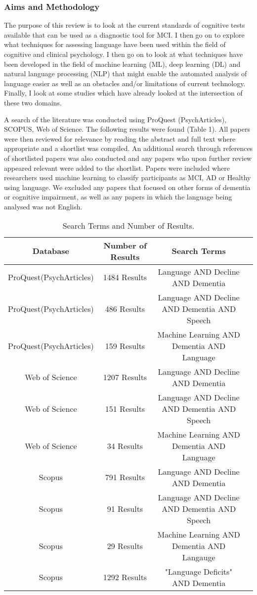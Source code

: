 \documentclass[12pt, twoside, a4paper]{article}
\begin{document}
\subsubsection{Aims and Methodology}
\par
The purpose of this review is to look at the current standards of cognitive tests available that can be used as a diagnostic tool for MCI. I then go on to explore what techniques for assessing language have been used within the field of cognitive and clinical psychology. I then go on to look at what techniques have been developed in the field of machine learning (ML), deep learning (DL) and natural language processing (NLP) that might enable the automated analysis of language easier as well as an obstacles and/or limitations of current technology. Finally, I look at some studies which have already looked at the intersection of these two domains. \newline
\par
A search of the literature was conducted using ProQuest (PsychArticles), SCOPUS, Web of Science. The following results were found (Table 1). All papers were then reviewed for relevance by reading the abstract and full text where appropriate and a shortlist was compiled. An additional search through references of shortlisted papers was also conducted and any papers who upon further review appeared relevant were added to the shortlist. Papers were included where researchers used machine learning to classify participants as MCI, AD or Healthy using language. We excluded any papers that focused on other forms of dementia or cognitive impairment, as well as any papers in which the language being analysed was not English. 
\begin{table}
	\begin{tabular}{ | c | c | c | p{1cm} |}
		\hline
		Database & Number of Results & Search Terms  \\ \hline
		ProQuest(PsychArticles) & 1484 Results & Language AND Decline AND Dementia \\ \hline
		ProQuest(PsychArticles) & 486 Results  & Language AND Decline AND Dementia AND Speech \\ \hline
		ProQuest(PsychArticles) & 159 Results & Machine Learning AND Dementia AND Language \\ \hline
		Web of Science & 1207 Results  & Language AND Decline AND Dementia   \\ \hline
		Web of Science & 151 Results  & Language AND Decline AND Dementia AND Speech  \\ \hline
		Web of Science & 34 Results & Machine Learning AND Dementia AND Language \\ \hline
		Scopus & 791 Results & Language AND Decline AND Dementia  \\ \hline
		Scopus & 91 Results & Language AND Decline AND Dementia AND Speech   \\ \hline
		Scopus & 29 Results & Machine Learning AND Dementia AND Langauge \\ \hline
		Scopus & 1292 Results & "Language Deficits" AND Dementia \\ \hline
	\end{tabular}
	\caption{\label{tab:table-name}Search Terms and Number of Results.}
\end{table}
\end{document}
